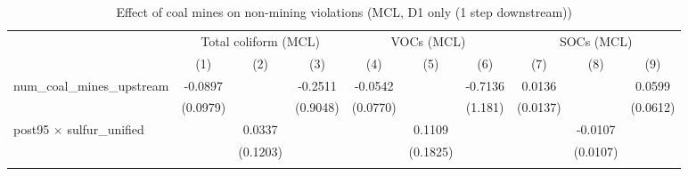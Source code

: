 
\begin{table}[htbp]
   
   \caption{\label{2sls_4step_d1_nonminevio_mcl} Effect of coal mines on non-mining violations (MCL, D1 only (1 step downstream))}
   \bigskip
   
   \centering
   
   \begin{adjustbox}{width = \textwidth, center}
      
      
      \begin{tabular}{lccccccccc}
         \toprule
         
          & \multicolumn{3}{c}{Total coliform (MCL)} & \multicolumn{3}{c}{VOCs (MCL)} & \multicolumn{3}{c}{SOCs (MCL)}\\
         
                                                           & (1)                   & (2)                   & (3)                   & (4)                   & (5)           & (6)           & (7)           & (8)           & (9)\\  
         
         \midrule 
         num\_coal\_mines\_upstream                        & -0.0897               &                       & -0.2511               & -0.0542               &               & -0.7136       & 0.0136        &               & 0.0599\\   
                                                           & (0.0979)              &                       & (0.9048)              & (0.0770)              &               & (1.181)       & (0.0137)      &               & (0.0612)\\   
         post95 $\times$ sulfur\_unified                   &                       & 0.0337                &                       &                       & 0.1109        &               &               & -0.0107       &   \\   
                                                           &                       & (0.1203)              &                       &                       & (0.1825)      &               &               & (0.0107)      &   \\   
         
          \\
         

\end{tabular}
\end{adjustbox}
\end{table}
